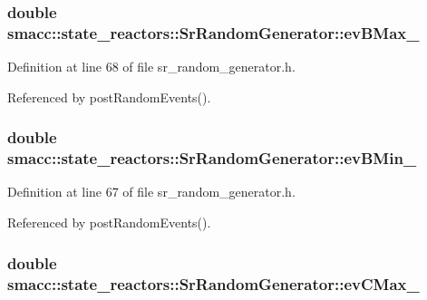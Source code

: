 \subsubsection[{\texorpdfstring{ev\+B\+Max\+\_\+}{evBMax_}}]{\setlength{\rightskip}{0pt plus 5cm}double smacc\+::state\+\_\+reactors\+::\+Sr\+Random\+Generator\+::ev\+B\+Max\+\_\+\hspace{0.3cm}{\ttfamily [private]}}\hypertarget{classsmacc_1_1state__reactors_1_1SrRandomGenerator_ad4b1ecc14ae3d153e3b1fe5006a8a192}{}\label{classsmacc_1_1state__reactors_1_1SrRandomGenerator_ad4b1ecc14ae3d153e3b1fe5006a8a192}


Definition at line 68 of file sr\+\_\+random\+\_\+generator.\+h.



Referenced by post\+Random\+Events().

\subsubsection[{\texorpdfstring{ev\+B\+Min\+\_\+}{evBMin_}}]{\setlength{\rightskip}{0pt plus 5cm}double smacc\+::state\+\_\+reactors\+::\+Sr\+Random\+Generator\+::ev\+B\+Min\+\_\+\hspace{0.3cm}{\ttfamily [private]}}\hypertarget{classsmacc_1_1state__reactors_1_1SrRandomGenerator_ae1022906bed4d126b7520f81c3e52976}{}\label{classsmacc_1_1state__reactors_1_1SrRandomGenerator_ae1022906bed4d126b7520f81c3e52976}


Definition at line 67 of file sr\+\_\+random\+\_\+generator.\+h.



Referenced by post\+Random\+Events().

\subsubsection[{\texorpdfstring{ev\+C\+Max\+\_\+}{evCMax_}}]{\setlength{\rightskip}{0pt plus 5cm}double smacc\+::state\+\_\+reactors\+::\+Sr\+Random\+Generator\+::ev\+C\+Max\+\_\+\hspace{0.3cm}{\ttfamily [private]}}\hypertarget{classsmacc_1_1state__reactors_1_1SrRandomGenerator_af74df138d11468fd2b1d998698fd9503}{}\label{classsmacc_1_1state__reactors_1_1SrRandomGenerator_af74df138d11468fd2b1d998698fd9503}


